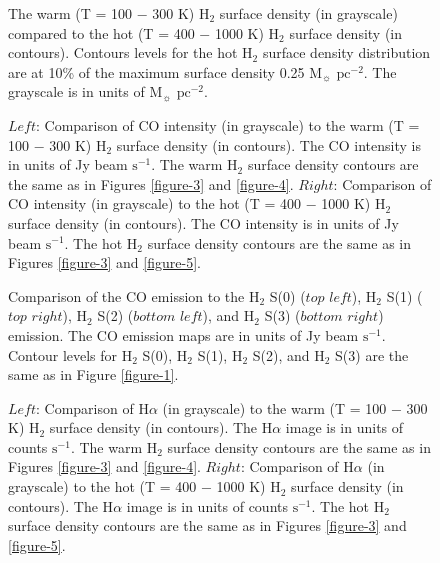 \documentclass[manuscript]{aastex}
\begin{document}
\clearpage

\begin{figure}
\caption{The warm (T = 100 $-$ 300 K) $\mathrm{H_2}$ surface density (in grayscale) compared to
 the hot (T = 400 $-$ 1000 K) $\mathrm{H_2}$ surface density (in contours).  Contours levels for the 
 hot $\mathrm{H_2}$ surface density distribution are at 10\% of the maximum surface density 
 0.25 $\mathrm{M_\sun}$ $\mathrm{pc^{-2}}$.  The grayscale is in units of 
 $\mathrm{M_\sun}$ $\mathrm{pc^{-2}}$.}
\label{figure-6}
\end{figure}

\clearpage

\begin{figure}
\caption{$Left$: Comparison of  CO intensity (in grayscale) to the warm (T = 100 $-$ 300 K) 
$\mathrm{H_2}$ surface density (in contours).  The CO intensity is in units of Jy beam $\mathrm{s^{-1}}$. 
The warm $\mathrm{H_2}$ surface density contours are the same as in Figures \ref{figure-3} and \ref{figure-4}.  $Right$: Comparison of CO intensity (in grayscale) to the hot (T = 400 $-$ 1000 K) 
$\mathrm{H_2}$ surface density (in contours).  The CO intensity is in units of Jy beam 
$\mathrm{s^{-1}}$. The hot $\mathrm{H_2}$ surface density contours are the same as in 
Figures \ref{figure-3} and \ref{figure-5}.}
\label{figure-7}
\end{figure}

\clearpage

\begin{figure}
\caption{Comparison of the CO emission to the $\mathrm{H_2}$ S(0) ($top$ $left$), 
 $\mathrm{H_2}$ S(1) ($top$ $right$),  $\mathrm{H_2}$ S(2) ($bottom$ $left$),  and 
 $\mathrm{H_2}$ S(3) ($bottom$ $right$) emission.  The CO emission maps are in 
 units of Jy beam $\mathrm{s^{-1}}$.  Contour levels for $\mathrm{H_2}$ S(0), 
 $\mathrm{H_2}$ S(1), $\mathrm{H_2}$ S(2), and $\mathrm{H_2}$ S(3) are the 
 same as in Figure \ref{figure-1}.}
\label{figure-8}
\end{figure}

\clearpage

\begin{figure}
\caption{$Left$: Comparison of  H$\alpha$ (in grayscale) to the warm (T = 100 $-$ 300 K) 
$\mathrm{H_2}$ surface density (in contours).  The H$\alpha$ image is in units of counts $\mathrm{s^{-1}}$. The warm $\mathrm{H_2}$ surface density contours are the same as in Figures \ref{figure-3} and \ref{figure-4}.  $Right$: Comparison of H$\alpha$ (in grayscale) to the hot (T = 400 $-$ 1000 K) $\mathrm{H_2}$ surface density (in contours).  The H$\alpha$ image is in units of counts $\mathrm{s^{-1}}$. The hot $\mathrm{H_2}$ surface density contours are the same as in Figures \ref{figure-3} and \ref{figure-5}.}
\label{figure-9}
\end{figure}
\end{document}
